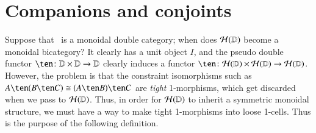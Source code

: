 \section{Companions and conjoints}
\label{sec:comp-conj}

Suppose that \lD\ is a monoidal double category; when does
$\mathcal{H}(\mathbb{D})$ become a monoidal bicategory?  It clearly has a
unit object $I$, and the pseudo double functor $\ten\maps
\lD\times\lD\to\lD$ clearly induces a functor $\ten\maps
\cH(\lD)\times\cH(\lD)\to\cH(\lD)$.  However, the problem is that the
constraint isomorphisms such as $A\ten (B\ten C)\iso (A\ten B)\ten C$
are \emph{tight} 1-morphisms, which get discarded when we pass to
$\mathcal{H}(\mathbb{D})$.  Thus, in order for $\mathcal{H}(\mathbb{D})$ to inherit a symmetric
monoidal structure, we must have a way to make tight 1-morphisms
into loose 1-cells.  Thus is the purpose of the following
definition.



